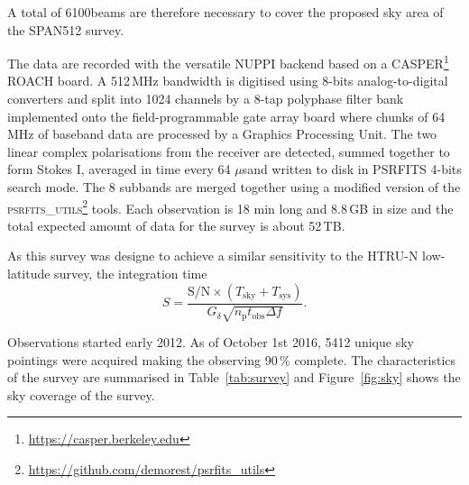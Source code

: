 \documentclass[a4paper,fleqn,usenatbib]{mnras}
\newcommand{\NBeam}{6100}
\newcommand{\us}{$\mu$s}
\begin{document}
A total of \NBeam beams are therefore necessary to cover the proposed sky area of the
SPAN512 survey.


The data are recorded with the versatile NUPPI backend \citep{dbc+11}
based on a CASPER\footnote{\url{https://casper.berkeley.edu}} ROACH
board. A 512\,MHz bandwidth is digitised using 8-bits
analog-to-digital converters and split into 1024 channels by a 8-tap
polyphase filter bank implemented onto the field-programmable gate
array board where chunks of 64 MHz of baseband data are processed by a
Graphics Processing Unit. The two linear complex polarisations from the receiver are
detected, summed together to form Stokes I, averaged in time every 64
\us and written to disk in \textsc{PSRFITS} 4-bits search mode. The 8
subbands are merged together using a modified version of the
\textsc{psrfits\_utils}\footnote{\url{https://github.com/demorest/psrfits_utils}}
tools. Each observation is 18 min long and 8.8\,GB in size and the total expected amount of data for the
survey is about 52\,TB.

As this survey was designe to achieve a similar sensitivity to the HTRU-N low-latitude survey, the integration time 
\begin{equation}
S = \frac{\text{S/N} \times (T_{\text{sky}} + T_{\text{sys}})}{G_\delta \sqrt{n_\text{p} t_{\text{obs}} \Delta f}}.
\end{equation}

Observations started early 2012. As of October 1st 2016, 5412 unique
sky pointings were acquired making the observing 90\,\% complete. The
characteristics of the survey are summarised in Table~\ref{tab:survey}
and Figure~\ref{fig:sky} shows the sky coverage of the survey.



\end{document}
